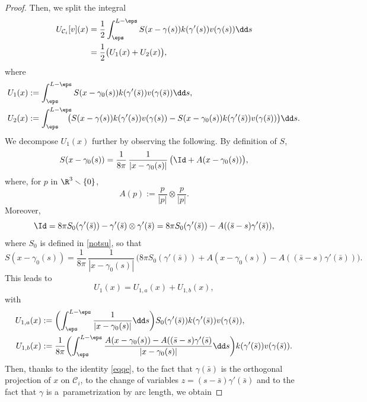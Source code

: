 \begin{proof}
Then, we split the integral
\begin{align}
\nonumber U_{\mathcal C_i}[v](x) &= \frac12 \int_\eps^{L-\eps} S(x - \gamma(s)) k(\gamma'(s)) v(\gamma (s)) \dd s
\label{indec}
\\ &= \frac12 \big(U_1 (x) + U_2 (x)\big),
\end{align}
where
\begin{align}
U_1 (x) &:= \int_\eps^{L-\eps} S(x - \gamma_0(s)) k(\gamma'(\bar s)) v(\gamma (\bar s)) \dd s, \\
U_2 (x)&:= \int_\eps^{L-\eps} \hspace*{-2mm}\bigl(S(x - \gamma(s)) k(\gamma'(s)) v(\gamma (s)) - S(x - \gamma_0(s)) k(\gamma'(\bar s)) v(\gamma (\bar s))\bigr) \dd s.
\end{align}
We decompose $U_1 (x)$ further by observing the following. By definition of $S$,
\begin{equation}
S(x - \gamma_0(s)) =
{\frac1{8\pi}}\,\frac 1 {|x - \gamma_0(s)|}\, \bigl(
\Id +A(x - \gamma_0(s))\bigr),
\end{equation}
where, for $p$ in $\R^3 \smallsetminus \{0\}$,
\[
A(p) := \frac p {|p|} \otimes \frac p {|p|}.\]
Moreover,
\begin{equation}
\Id = {8\pi} S_0 (\gamma'(\bar s)) - \gamma'(\bar s) \otimes \gamma'(\bar s) = {8\pi}S_0 (\gamma'(\bar s)) - A((\bar s - s) \gamma'(\bar s)),
\end{equation}
where $S_0$ is defined in \eqref{notsu},
so that
\begin{equation}
S(x - \gamma_0(s)) = \frac1{8\pi}\,\frac 1 {|x - \gamma_0(s)|}\, \bigl(
{8\pi}S_0 (\gamma'(\bar s)) +A(x - \gamma_0(s)) - A((\bar s - s) \gamma'(\bar s))\bigr).
\end{equation}
This leads to
\begin{equation}
\label{redec}
U_1 (x) = U_{1,a} (x) + U_{1,b} (x),
\end{equation}
with
\begin{align*}
U_{1,a} (x) &:= \biggl(\int_\eps^{L-\eps} \frac 1 {|x - \gamma_0(s)|} \dd s \biggr) S_0 (\gamma'(\bar s)) k(\gamma'(\bar s)) v(\gamma (\bar s)),\\
U_{1,b} (x) &:=
{\frac1{8\pi}}\biggl(\int_\eps^{L-\eps} \frac {A(x - \gamma_0(s)) - A((\bar s - s) \gamma'(\bar s)} {|x - \gamma_0(s)|}
\dd s \biggr) k(\gamma'(\bar s)) v(\gamma (\bar s)).
\end{align*}
Then, thanks to the identity \eqref{eqqe}, to the fact that $\gamma (\bar s)$ is
the orthogonal projection of $x$ on
$\mathcal C_i$, to the change of variables $z=(s-\bar s)\gamma'(\bar s)$ and to the fact that $\gamma$ is a~parametrization by arc length, we obtain

\end{proof}
